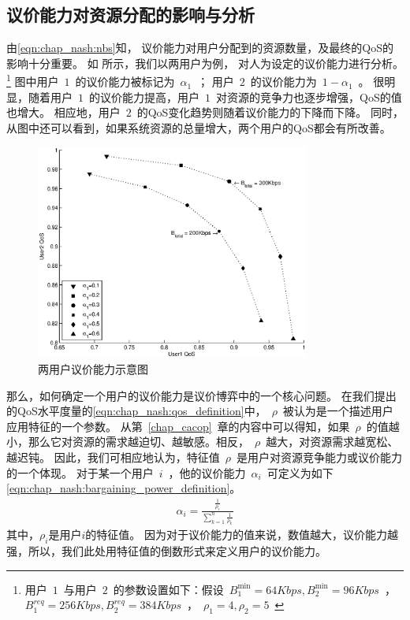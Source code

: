 \subsection{议价能力对资源分配的影响与分析}
由\eqref{eqn:chap_nash:nbs}知，
议价能力对用户分配到的资源数量，及最终的QoS的影响十分重要。
如 所示，我们以两用户为例，
对人为设定的议价能力进行分析。
\footnote{用户~$1$~与用户~$2$~的参数设置如下：假设~$B_1^{\min}=64Kbps, B_2^{\min}=96Kbps$~，~$B_1^{req}=256Kbps, B_2^{req}=384Kbps$~，~$\rho_1=4, \rho_2=5$~}
图中用户~$1$~的议价能力被标记为~$\alpha_1$~；
用户~$2$~的议价能力为~$1-\alpha_1$~。
很明显，随着用户~$1$~的议价能力提高，用户~$1$~对资源的竞争力也逐步增强，QoS的值也增大。
相应地，用户~$2$~的QoS变化趋势则随着议价能力的下降而下降。
同时，从图中还可以看到，如果系统资源的总量增大，两个用户的QoS都会有所改善。
\begin{figure}[!tb] 
    \centering 
    \includegraphics[width = 9cm]{chap_nash_two_users_nbs_qos.eps} 
    \caption{两用户议价能力示意图}
    \label{fig:chap_nash:two_users_nbs_qos} 
\end{figure}
那么，如何确定一个用户的议价能力是议价博弈中的一个核心问题。
在我们提出的QoS水平度量的\eqref{eqn:chap_nash:qos_definition}中，~$\rho$~被认为是一个描述用户应用特征的一个参数。
从第~\ref{chap_cacop}~章的内容中可以得知，如果~$\rho$~的值越小，那么它对资源的需求越迫切、越敏感。相反，~$\rho$~越大，对资源需求越宽松、越迟钝。
因此，我们可相应地认为，特征值~$\rho$~是用户对资源竞争能力或议价能力的一个体现。
对于某一个用户~$i$~，他的议价能力~$\alpha_i$~可定义为如下\eqref{eqn:chap_nash:bargaining_power_definition}。
\begin{align}
    \alpha_i = \frac{\frac{1}{\rho_i}}{\sum_{k=1}^n \frac{1}{\rho_k} }
    \label{eqn:chap_nash:bargaining_power_definition}
\end{align}
其中，$\rho_i$是用户$i$的特征值。
因为对于议价能力的值来说，数值越大，议价能力越强，所以，我们此处用特征值的倒数形式来定义用户的议价能力。



